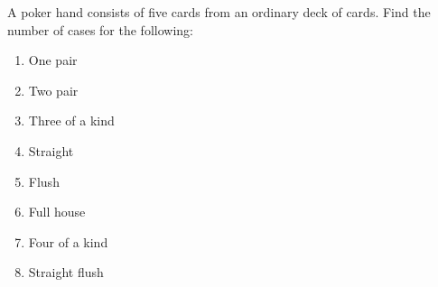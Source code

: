 \documentclass[../main.tex]{subfiles}
\begin{document}
\begin{prob} 
    A poker hand consists of five cards from an ordinary deck of cards.
    Find the number of cases for the following:
    \begin{enumerate}
        \item One pair
        \item Two pair
        \item Three of a kind
        \item Straight
        \item Flush
        \item Full house
        \item Four of a kind
        \item Straight flush
    \end{enumerate}
\end{prob}
\end{document}
